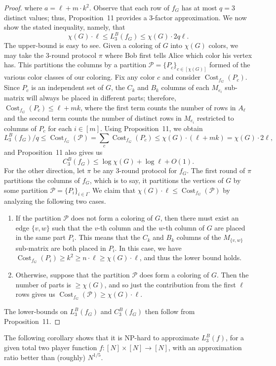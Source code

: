 \begin{proof}
where $a=\ell+m\cdot k^2$. Observe that each row of $f_G$ has at most $q=3$ distinct values; thus, Proposition~11 provides a 3-factor approximation. We now show the stated inequality, namely, that
\[\chi(G)\cdot\ell\le L_3^B(f_G)\le\chi(G)\cdot2q\ell.\]
The upper-bound is easy to see. Given a coloring of $G$ into $\chi(G)$ colors, we may take the 3-round protocol $\pi$ where Bob first tells Alice which color his vertex has. This partitions the columns by a partition $\mathcal P=\{P_c\}_{c\in[\chi(G)]}$ formed of the various color classes of our coloring. Fix any color $c$ and consider $\operatorname{Cost}_{f_G}(P_c)$. Since $P_c$ is an independent set of $G$, the $C_k$ and $B_k$ columns of each $M_{e_i}$ sub-matrix will always be placed in different parts; therefore, $\operatorname{Cost}_{f_G}(P_c)\le\ell+mk$, where the first term counts the number of rows in $A_\ell$ and the second term counts the number of distinct rows in $M_{e_i}$ restricted to columns of $P_c$ for each $i\in[m]$. Using Proposition~11, we obtain
\[L_3^B(f_G)/q\le\operatorname{Cost}_{f_G}(\mathcal P)=\sum_c\operatorname{Cost}_{f_G}(P_c)\le\chi(G)\cdot(\ell+mk)=\chi(G)\cdot2\ell,\]
and Proposition~11 also gives us
\[C_3^B(f_G)\le\log\chi(G)+\log\ell+O(1).\]
For the other direction, let $\pi$ be any 3-round protocol for $f_G$. The first round of $\pi$ partitions the columns of $f_G$, which is to say, it partitions the vertices of $G$ by some partition $\mathcal P=\{P_i\}_{i\in I}$. We claim that $\chi(G)\cdot\ell\le\operatorname{Cost}_{f_G}(\mathcal P)$ by analyzing the following two cases.
\begin{enumerate}
\item If the partition $\mathcal P$ does not form a coloring of $G$, then there must exist an edge $\{v,w\}$ such that the $v$-th column and the $w$-th column of $G$ are placed in the same part $P_i$. This means that the $C_k$ and $B_k$ columns of the $M_{\{v,w\}}$ sub-matrix are both placed in $P_i$. In this case, we have $\operatorname{Cost}_{f_G}(P_i)\ge k^2\ge n\cdot\ell\ge\chi(G)\cdot\ell$, and thus the lower bound holds.
\item Otherwise, suppose that the partition $\mathcal P$ does form a coloring of $G$. Then the number of parts is $\ge\chi(G)$, and so just the contribution from the first $\ell$ rows gives us $\operatorname{Cost}_{f_G}(\mathcal P)\ge\chi(G)\cdot\ell$.
\end{enumerate}
The lower-bounds on $L_3^B(f_G)$ and $C_3^B(f_G)$ then follow from Proposition~11.
\end{proof}
The following corollary shows that it is NP-hard to approximate $L_3^B(f)$, for a given total two player function $f:[N]\times[N]\to[N]$, with an approximation ratio better than (roughly) $N^{1/5}$.
